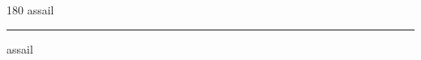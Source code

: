 
\begin{frame}
\begin{center}
\begin{turn}{180}
{\fontsize{2.5cm}{1em}\selectfont assail}
\end{turn}
\vspace{1em}\par  
\hrule
\vspace{1em}\par  
{\fontsize{2.5cm}{1em}\selectfont assail}
\end{center}
\end{frame}
